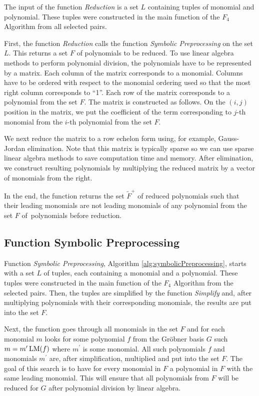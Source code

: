 The input of the function \textit{Reduction} is a set $L$ containing tuples of monomial and polynomial. These tuples were constructed in the main function of the $F_4$ Algorithm from all selected pairs.

First, the function \textit{Reduction} calls the function \textit{Symbolic Preprocessing} on the set $L$. This returns a set $F$ of polynomials to be reduced. To use linear algebra methods to perform polynomial division, the polynomials have to be represented by a matrix. Each column of the matrix corresponds to a monomial. Columns have to be ordered with respect to the monomial ordering used so that the most right column corresponds to ``1''. Each row of the matrix corresponds to a polynomial from the set $F$. The matrix is constructed as follows. On the $(i, j)$ position in the matrix, we put the coefficient of the term corresponding to $j$-th monomial from the $i$-th polynomial from the set $F$.

We next reduce the matrix to a row echelon form using, for example, Gauss-Jordan elimination. Note that this matrix is typically sparse so we can use sparse linear algebra methods to save computation time and memory. After elimination, we construct resulting polynomials by multiplying the reduced matrix by a vector of monomials from the right.

In the end, the function returns the set $\tilde{F}^+$ of reduced polynomials such that their leading monomials are not leading monomials of any polynomial from the set $F$ of~polynomials before reduction.



\subsection{Function Symbolic Preprocessing}
Function \textit{Symbolic Preprocessing}, Algorithm \ref{alg:symbolicPreprocessing}, starts with a set $L$ of tuples, each containing a monomial and a polynomial. These tuples were constructed in the main function of the $F_4$ Algorithm from the selected pairs. Then, the tuples are simplified by the function \textit{Simplify} and, after multiplying polynomials with their corresponding monomials, the results are put into the set $F$.

Next, the function goes through all monomials in the set $F$ and for each monomial $m$ looks for some polynomial $f$ from the Gr\"obner basis $G$ such $m = m^\prime\operatorname{LM}(f)$ where $m^\prime$ is some monomial. All such polynomials $f$ and monomials $m^\prime$ are, after simplification, multiplied and put into the set $F$. The goal of this search is to have for every monomial in $F$ a polynomial in $F$ with the same leading monomial. This will ensure that all polynomials from $F$ will be reduced for $G$ after polynomial division by linear algebra.

